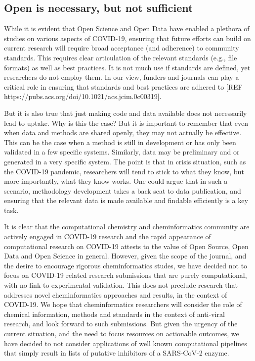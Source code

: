\documentclass{bmcart}
\begin{document}
\subsection*{Open is necessary, but not sufficient}

While it is evident that Open Science and Open Data have enabled a
plethora of studies on various aspects of COVID-19, ensuring that
future efforts can build on current research will require broad
acceptance (and adherence) to community standards. This requires clear
articulation of the relevant standards (e.g., file formats) as well as
best practices. It is not much use if standards are defined, yet
researchers do not employ them. In our view, funders and journals can
play a critical role in ensuring that standards and best practices are
adhered to [REF https://pubs.acs.org/doi/10.1021/acs.jcim.0c00319].

But it is also true that just making code and data available does not
necessarily lead to uptake. Why is this the case? 
But it is important to remember that even when data and methods are
shared openly, they may not actually be effective. This can be the
case when a method is still in development or has only been validated
in a few specific systems. Similarly, data may be preliminary and or
generated in a very specific system. The point is that in crisis
situation, such as the COVID-19 pandemic, researchers will tend to
stick to what they know, but more importantly, what they know
works. One could argue that in such a scenario, methodology
development takes a back seat to data publication, and ensuring that
the relevant data is made available and findable efficiently is a key
task.





It is clear that the computational chemistry and cheminformatics
community are actively engaged in COVID-19 research and the rapid
appearance of computational research on COVID-19 attests to the value
of Open Source, Open Data and Open Science in general. However, given
the scope of the journal, and the desire to encourage rigorous
cheminformatics studes, we have decided not to focus on COVID-19
related research submissions that are purely computational, with no
link to experimental validation. This does not preclude research that
addresses novel cheminformatics approaches and results, in the context
of COVID-19. We hope that cheminformatics researchers will consider
the role of chemical information, methods and standards in the context
of anti-viral research, and look forward to such submissions. But
given the urgency of the current situation, and the need to focus
resources on actionable outcomes, we have decided to not consider
applications of well known computational pipelines that simply result
in lists of putative inhibitors of a SARS-CoV-2 enzyme.
\end{document}
